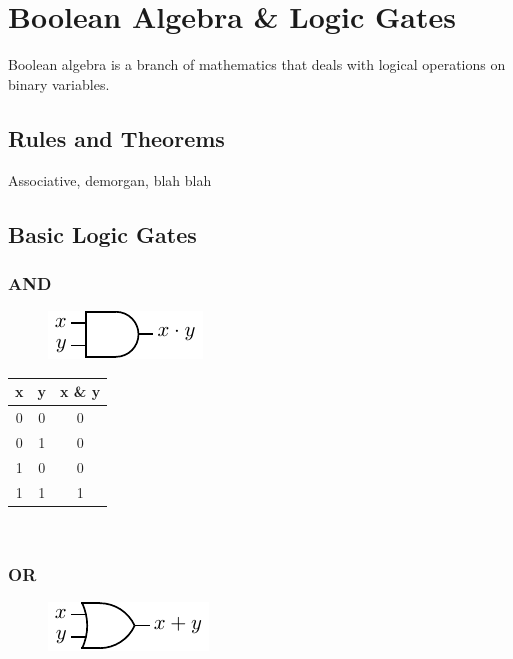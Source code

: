 \chapter{Boolean Algebra \& Logic Gates}

Boolean algebra is a branch of mathematics that deals with logical operations on binary variables.

\section{Rules and Theorems}

Associative, demorgan, blah blah

\section{Basic Logic Gates}

\subsection{AND}

\begin{figure}[h!]
	\includegraphics{./img/and.png}
\end{figure}

\begin{tabular}{c c c}
	\hline
	\textbf{x} & \textbf{y} & \textbf{x \& y} \\ 
	\hline
	0 & 0 & 0 \\
	0 & 1 & 0 \\
	1 & 0 & 0 \\
	1 & 1 & 1 \\
	\hline 
\end{tabular} \\

\subsection{OR}

\begin{figure}[h!]
	\includegraphics{./img/or.png}
\end{figure}

